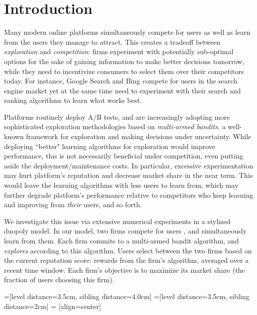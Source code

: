 \documentclass[../competing_bandits_with_appendix.tex]{subfiles}
\begin{document}
\section{Introduction}\label{section:1}

Many modern online platforms simultaneously compete for users as well as learn from the users they manage to attract. This creates a tradeoff between \textit{exploration} and \textit{competition}: firms experiment with potentially sub-optimal options for the sake of gaining information to make better decisions tomorrow, while they need to incentivize consumers to select them over their competitors today. For instance, Google Search and Bing compete for users in the search engine market yet at the same time need to experiment with their search and ranking algorithms to learn what works best.

Platforms routinely deploy A/B tests, and are increasingly adopting  more sophisticated exploration methodologies based on \emph{multi-armed bandits}, a well-known framework for exploration and making decisions under uncertainty. While deploying ``better" learning algorithms for exploration would improve performance, this is not necessarily beneficial under competition, even putting aside the deployment/maintenance costs. In particular, excessive experimentation may hurt platform's reputation and decrease market share in the near term. This would leave the learning algorithms with less users to learn from, which may further degrade platform's performance relative to competitors who keep learning and improving from \emph{their} users, and so forth.

 We investigate this issue via extensive numerical experiments in a stylized duopoly model. In our model, two firms compete for users , and simultaneously learn from them. Each firm commits to a multi-armed bandit algorithm, and \emph{explores} according to this algorithm. Users select between the two firms based on the current reputation score: rewards from the firm's algorithm, averaged over a recent time window. Each firm's objective is to maximize its  market share (the fraction of users choosing this firm).

=[level distance=3.5cm, sibling distance=4.0cm]
=[level distance=3.5cm, sibling distance=2cm]
 = [align=center]
\end{document}

